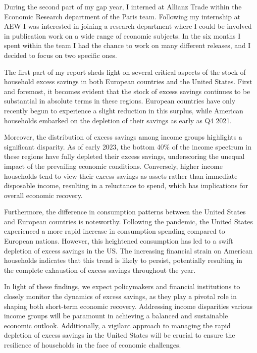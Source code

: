 \quad During the second part of my gap year, I interned at Allianz Trade within the Economic Research department of the Paris team. 
Following my internship at AEW I was interested in joining a research department where I could be involved in publication work on a wide range of economic subjects. 
In the six months I spent within the team I had the chance to work on many different releases, and I decided to focus on two specific ones.

The first part of my report sheds light on several critical aspects of the stock of household excess savings in both European countries and the United States. 
First and foremost, it becomes evident that the stock of excess savings continues to be substantial in absolute terms in these regions. 
European countries have only recently begun to experience a slight reduction in this surplus, while American households embarked on the depletion of their savings as early as Q4 2021.

Moreover, the distribution of excess savings among income groups highlights a significant disparity. 
As of early 2023, the bottom 40\% of the income spectrum in these regions have fully depleted their excess savings, underscoring the unequal impact of the prevailing economic conditions. 
Conversely, higher income households tend to view their excess savings as assets rather than immediate disposable income, resulting in a reluctance to spend, which has implications for overall economic recovery.

Furthermore, the difference in consumption patterns between the United States and European countries is noteworthy. 
Following the pandemic, the United States experienced a more rapid increase in consumption spending compared to European nations. 
However, this heightened consumption has led to a swift depletion of excess savings in the US. 
The increasing financial strain on American households indicates that this trend is likely to persist, potentially resulting in the complete exhaustion of excess savings throughout the year.

In light of these findings, we expect policymakers and financial institutions to closely monitor the dynamics of excess savings, as they play a pivotal role in shaping both short-term economic recovery. 
Addressing income disparities various income groups will be paramount in achieving a balanced and sustainable economic outlook. 
Additionally, a vigilant approach to managing the rapid depletion of excess savings in the United States will be crucial to ensure the resilience of households in the face of economic challenges.

